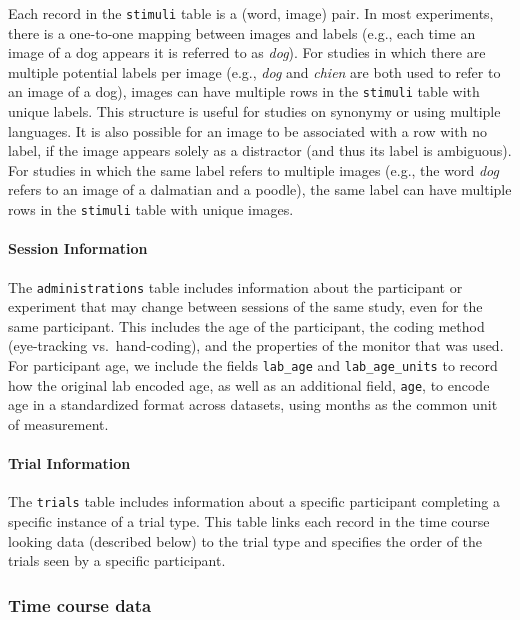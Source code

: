 \documentclass[
  english,
  man,floatsintext]{apa6}
\let\oldparagraph\paragraph
\renewcommand{\paragraph}[1]{\oldparagraph{#1}\mbox{}}
\begin{document}
Each record in the \texttt{stimuli} table is a (word, image) pair.
In most experiments, there is a one-to-one mapping between images and labels (e.g., each time an image of a dog appears it is referred to as \emph{dog}).
For studies in which there are multiple potential labels per image (e.g., \emph{dog} and \emph{chien} are both used to refer to an image of a dog), images can have multiple rows in the \texttt{stimuli} table with unique labels.
This structure is useful for studies on synonymy or using multiple languages.
It is also possible for an image to be associated with a row with no label, if the image appears solely as a distractor (and thus its label is ambiguous).
For studies in which the same label refers to multiple images (e.g., the word \emph{dog} refers to an image of a dalmatian and a poodle), the same label can have multiple rows in the \texttt{stimuli} table with unique images.

\hypertarget{session-information}{%
\paragraph{Session Information}\label{session-information}}

The \texttt{administrations} table includes information about the participant or experiment that may change between sessions of the same study, even for the same participant.
This includes the age of the participant, the coding method (eye-tracking vs.~hand-coding), and the properties of the monitor that was used.
For participant age, we include the fields \texttt{lab\_age} and \texttt{lab\_age\_units} to record how the original lab encoded age, as well as an additional field, \texttt{age}, to encode age in a standardized format across datasets, using months as the common unit of measurement.

\hypertarget{trial-information}{%
\paragraph{Trial Information}\label{trial-information}}

The \texttt{trials} table includes information about a specific participant completing a specific instance of a trial type.
This table links each record in the time course looking data (described below) to the trial type and specifies the order of the trials seen by a specific participant.

\hypertarget{time-course-data}{%
\subsubsection{Time course data}\label{time-course-data}}
\end{document}
